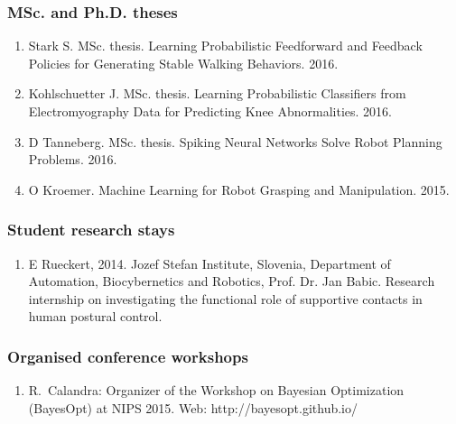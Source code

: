 \subsubsection{MSc. and Ph.D. theses}%
\begin{enumerate}
 \item Stark S. MSc. thesis. Learning Probabilistic Feedforward and Feedback Policies for Generating Stable Walking Behaviors. 2016.
 \item Kohlschuetter J. MSc. thesis. Learning Probabilistic Classifiers from Electromyography Data for Predicting Knee Abnormalities. 2016.
 \item D Tanneberg. MSc. thesis. Spiking Neural Networks Solve Robot Planning Problems. 2016.
 \item O Kroemer. Machine Learning for Robot Grasping and Manipulation. 2015.
\end{enumerate}

\subsubsection{Student research stays}

\begin{enumerate}
 \item E Rueckert, 2014. Jozef Stefan Institute, Slovenia, Department of Automation, Biocybernetics and Robotics, Prof. Dr. Jan Babic. Research internship on investigating the functional role of supportive contacts in human postural control. 
\end{enumerate}

\subsubsection{Organised conference workshops}

\begin{enumerate}
\item  R.~Calandra: Organizer of the Workshop on Bayesian Optimization (BayesOpt) at NIPS 2015. Web: http://bayesopt.github.io/
\end{enumerate}


